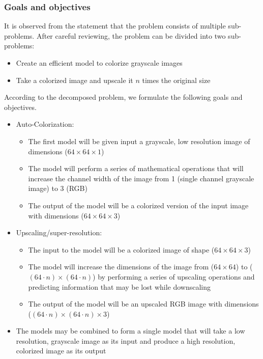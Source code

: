\documentclass[oneside,a4paper,12pt]{report}
\begin{document}
\subsubsection{Goals and objectives}
\hspace*{0.25 in}It is observed from the statement that the problem consists of multiple sub-problems. After careful reviewing, the problem can be divided into two sub-problems:
\begin{itemize}
	\item Create an efficient model to colorize grayscale images
	\item Take a colorized image and upscale it $n$ times the original size
\end{itemize}
\hspace*{0.25 in}According to the decomposed problem, we formulate the following goals and objectives.
\begin{itemize}
\item Auto-Colorization:
	\begin{itemize}
		\item The first model will be given input a grayscale, low resolution image of dimensions ($64\times 64\times 1$)
  		\item The model will perform a series of mathematical operations that will increase the channel width of the image from 1 (single channel grayscale image) to 3 (RGB)
  		\item The output of the model will be a colorized version of the input image with dimensions ($64\times 64\times 3$)
	\end{itemize}
\item Upscaling/super-resolution:
  	\begin{itemize}
  		\item The input to the model will be a colorized image of shape ($64\times 64\times 3$)
  		\item The model will increase the dimensions of the image from ($64\times 64$) to ($(64\cdot n)\times (64\cdot n)$) by performing a series of upscaling operations and predicting information that may be lost while downscaling
  		\item The output of the model will be an upscaled RGB image with dimensions ($(64\cdot n)\times (64\cdot n)\times 3$)
  	\end{itemize}
  	\item The models may be combined to form a single model that will take a low resolution, grayscale image as its input and produce a high resolution, colorized image as its output
\end{itemize}
\end{document}
